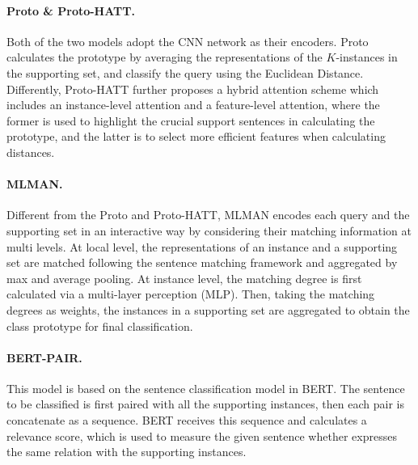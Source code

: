 \documentclass[11pt]{article}
\begin{document}
\paragraph{Proto \& Proto-HATT.} Both of the two models adopt the CNN network as their encoders.
  {Proto} calculates the prototype by averaging the representations of the $K$-instances in the supporting set, and classify the query using the Euclidean Distance.
    Differently, {Proto-HATT} further proposes a hybrid attention scheme which includes an instance-level attention and a feature-level attention, where the former is used to highlight the crucial support sentences in calculating the prototype, and the latter is to select more efficient features when calculating distances. 
\paragraph{MLMAN.} Different from the Proto and Proto-HATT, {MLMAN} encodes each query and the supporting set in an interactive way by considering their matching information at multi levels.
  At local level, the representations of an instance and a supporting set are matched following the sentence matching framework \cite{chen-etal-2017-enhanced} and aggregated by max and average pooling.
  At instance level, the matching degree is first calculated via a multi-layer perception (MLP).
  Then, taking the matching degrees as weights, the instances in a supporting set are aggregated to obtain the class prototype for final classification.
\paragraph{BERT-PAIR.} This model is based on the sentence classification model in BERT. The sentence to be classified is first paired with all the supporting instances, then each pair is concatenate as a sequence. BERT receives this sequence and calculates a relevance score, which is used to measure the given sentence whether expresses the same relation with the supporting instances.  
\end{document}
